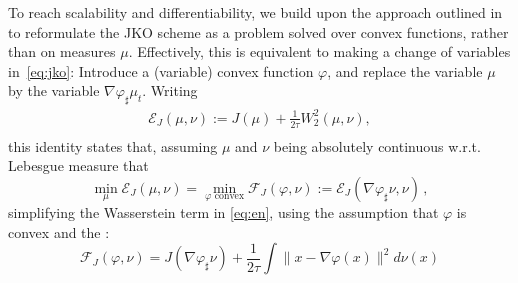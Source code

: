  To reach scalability and differentiability, we build upon the approach outlined in \citet{benamou2016discretization} to reformulate the \acrshort{JKO} scheme as a problem solved over convex functions, rather than on measures $\mu$. Effectively, this is equivalent to making a change of variables in~\eqref{eq:jko}: Introduce a (variable) convex function $\varphi$, and replace the variable $\mu$ by the variable $\nabla \varphi_{\sharp}\mu_t$. Writing
\begin{equation}\label{eq:en}
\begin{split}
\mathcal{E}_J(\mu, \nu) := J(\mu) +\frac{1}{2 \tau}W_2^2(\mu, \nu),\\
\end{split}
\end{equation}
this identity states that, assuming $\mu$ and $\nu$ being absolutely continuous w.r.t. Lebesgue measure that
$$\min_{\mu}\mathcal{E}_J(\mu,\nu) = \min_{\varphi \text{ convex}} \mathcal{F}_J(\varphi, \nu):= \mathcal{E}_J(\nabla \varphi_{\sharp}\nu, \nu)\,,$$
simplifying the Wasserstein term in \eqref{eq:en}, using the assumption that $\varphi$ is convex and the :
\begin{equation}\mathcal{F}_J(\varphi, \nu) = J(\nabla \varphi_{\sharp}\nu) +\frac{1}{2 \tau} \!\! \int\!\! \| x - \nabla \varphi(x) \|^2 d \nu(x)\label{eq:jko_psi}
\end{equation}

